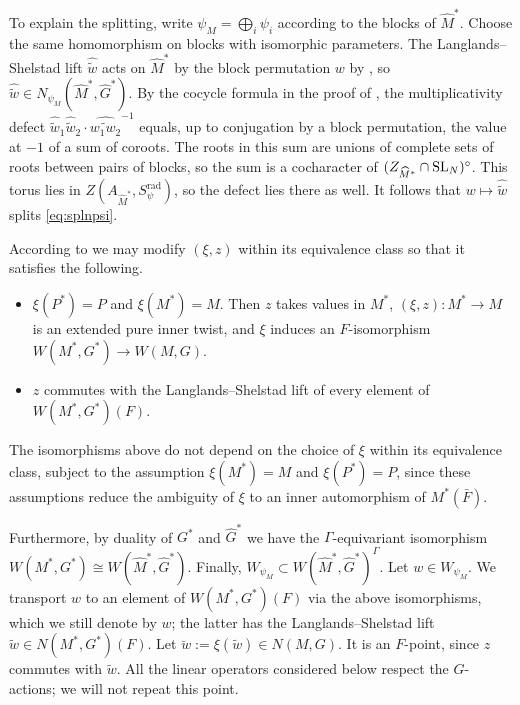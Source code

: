 \documentclass[11pt,reqno]{amsart}
\theoremstyle{plain}
\theoremstyle{definition}
\newcommand{\SL}{\tu{SL}}
\newcommand{\tu}{\textup}
\renewcommand{\hat}{\widehat}
\numberwithin{equation}{subsection}
\begin{document}
To explain the splitting, write $\psi_M=\bigoplus_i\psi_i$ according to the blocks of $\hat M^*$. Choose the same homomorphism on blocks with isomorphic parameters.
The Langlands--Shelstad lift $\widehat{\tilde w}$ acts on $\hat M^*$
by the block permutation $w$ by \cite[Lem.~0.4.16]{KMSW}, so $\widehat{\tilde w}\in N_{\psi_M}(\hat M^*,\hat G^*)$.
By the cocycle formula in the proof of \cite[Lem.~2.3.1]{KMSW}, the
multiplicativity defect $\widehat{\tilde w}_1  \widehat{\tilde w}_2 \cdot \widehat{\widetilde{w_1w_2}}^{-1}$ equals, up to conjugation by a block
permutation, the value at $-1$ of a sum of coroots. The roots in
this sum are unions of complete sets of roots between pairs of blocks,
so the sum is a cocharacter of $(Z_{\hat M^*}\cap\SL_N)^\circ$.
This torus lies in $Z(A_{\hat M^*},S_\psi^{\mathrm{rad}})$, so the defect lies there as well. It follows that $w\mapsto \widehat{\tilde w}$ splits \eqref{eq:splnpsi}.

According to \cite[Lem.~0.4.18]{KMSW} we may modify $(\xi,z)$ within its equivalence class so that it satisfies the following.

\begin{itemize}
    \item $\xi(P^*)=P$ and $\xi(M^*)=M$. Then $z$ takes values in $M^*$, $(\xi,z) : M^* \to M$ is an extended pure inner twist, and $\xi$ induces an $F$-isomorphism $W(M^*,G^*) \to W(M,G)$.
    \item $z$ commutes with the Langlands--Shelstad lift of every element of $W(M^*,G^*)(F)$.
\end{itemize}

The isomorphisms above do not depend on the choice of $\xi$ within its equivalence class, subject to the assumption $\xi(M^*)=M$ and $\xi(P^*)=P$, since these assumptions reduce the ambiguity of $\xi$ to an inner automorphism of $M^*(\bar F)$.

Furthermore, by duality of $G^*$ and $\hat G^*$ we have the $\Gamma$-equivariant isomorphism $W(M^*,G^*) \cong W(\hat M^*,\hat G^*)$. Finally, $W_{\psi_M} \subset W(\hat M^*,\hat G^*)^\Gamma$.
Let $w\in W_{\psi_M}$. We transport $w$ to an element of $W(M^*,G^*)(F)$ via the above isomorphisms, which we still denote by $w$; the latter has the Langlands--Shelstad lift $\tilde w\in N(M^*,G^*)(F)$. Let $\breve w := \xi(\tilde w) \in N(M,G)$. It is an $F$-point, since $z$ commutes with $\tilde w$. 
All the linear operators considered below respect the $G$-actions; we will not repeat this point. 
\end{document}

